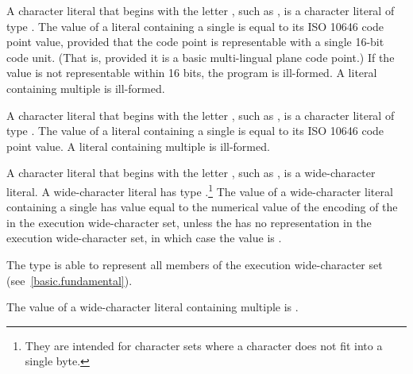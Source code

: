 \pnum
{}%
%
A character literal that begins with the letter , such as
, is a character literal of type . The value
of a  literal containing a single  is
equal to its ISO 10646 code point value, provided that the code point is
representable with a single 16-bit code unit. (That is, provided it is a
basic multi-lingual plane code point.) If the value is not representable
within 16 bits, the program is ill-formed. A  literal
containing multiple  is ill-formed.

\pnum
{}%
%
A character
literal that begins with the letter , such as , is
a character literal of type . The value of a
 literal containing a single  is equal
to its ISO 10646 code point value. A  literal containing
multiple  is ill-formed.

\pnum
{}%
%
%
A character literal that
begins with the letter , such as ,
%
is a wide-character literal. A wide-character literal has type
.\footnote{They are intended for character sets where a character does
not fit into a single byte. }
The value of a wide-character literal containing a single
 has value equal to the numerical value of the encoding
of the  in the execution wide-character set, unless the
 has no representation in the execution wide-character set, in which
case the value is . \begin{note} The type  is able to
represent all members of the execution wide-character set (see~\ref{basic.fundamental}).
\end{note} The value
of a wide-character literal containing multiple  is
.

